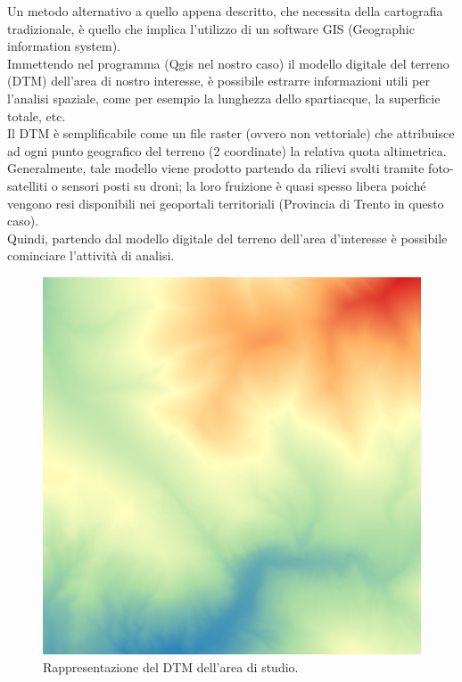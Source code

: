 Un metodo alternativo a quello appena descritto, che necessita della cartografia tradizionale, è quello che implica l'utilizzo di un software GIS (Geographic information system).\\
Immettendo nel programma (Qgis nel nostro caso) il modello digitale del terreno (DTM) dell'area di nostro interesse, è possibile estrarre informazioni utili per l'analisi spaziale, come per esempio la lunghezza dello spartiacque, la superficie totale, etc.\\
Il DTM è semplificabile come un file raster (ovvero non vettoriale) che attribuisce ad ogni punto geografico del terreno (2 coordinate) la relativa quota altimetrica. Generalmente, tale modello viene prodotto partendo da rilievi svolti tramite foto-satelliti o sensori posti su droni; la loro fruizione è quasi spesso libera poiché vengono resi disponibili nei geoportali territoriali (Provincia di Trento in questo caso).\\
Quindi, partendo dal modello digitale del terreno dell'area d'interesse è possibile cominciare l'attività di analisi.\\
\begin{figure}[H]\centering
    \includegraphics[scale=.50]{immagini/dtm_qgis.PNG}
    \caption{Rappresentazione del DTM dell'area di studio.}
    \label{dtm_qgis}
\end{figure}
